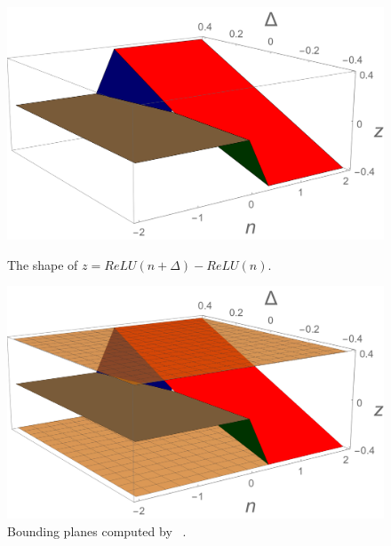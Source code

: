 \begin{figure}
\centering
%
\begin{minipage}[t]{0.45\linewidth}
\centering
\includegraphics[width=\linewidth]{neurodiff/figs/equation1.png}
\caption{The shape of $ z = ReLU(n + \Delta) - ReLU(n) $.}
\label{neurodiff:fig:equation1}
\end{minipage}%
%
\hspace{0.09\linewidth}
%
\begin{minipage}[t]{0.45\linewidth}
\centering
\includegraphics[width=\linewidth]{neurodiff/figs/naiveboundingplanes.png}
\caption{Bounding planes computed by \ReluDiff{}~\cite{PaulsenWW20}.}
\label{neurodiff:fig:naiveboundingplanes}
\end{minipage}


\end{figure}

